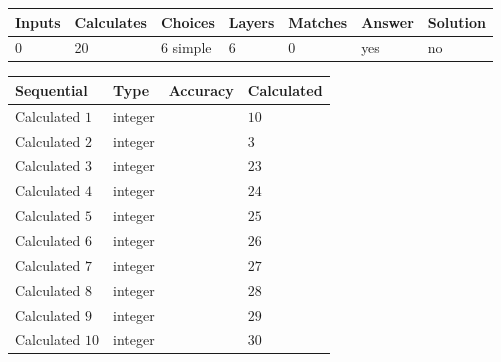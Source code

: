 \documentclass[12pt]{article}
\begin{document}
 
\noindent{}
 
 
   
   
   
   
\noindent\begin{tabular}{|l|l|l|l|l|l|l|}
 \hline
Inputs & Calculates & Choices & Layers & Matches & Answer & Solution \\ \hline
           0 & 
          20 & 
           6
  simple  
  & 
           6 & 
           0 & 
  yes & 
  no 
  \\ \hline
 \end{tabular}
   
   
   
   
\noindent{}
   
   
  
  
\noindent\begin{tabular}{|l|l|l|l|}
\hline
 Sequential & Type & Accuracy & Calculated \\ 
\hline
 
 
  Calculated $           1$ & integer &  & 
  $ 10 $ 
 \\  \hline  
 
 
  Calculated $           2$ & integer &  & 
  $ 3 $ 
 \\  \hline  
 
 
  Calculated $           3$ & integer &  & 
  $ 23 $ 
 \\  \hline  
 
 
  Calculated $           4$ & integer &  & 
  $ 24 $ 
 \\  \hline  
 
 
  Calculated $           5$ & integer &  & 
  $ 25 $ 
 \\  \hline  
 
 
  Calculated $           6$ & integer &  & 
  $ 26 $ 
 \\  \hline  
 
 
  Calculated $           7$ & integer &  & 
  $ 27 $ 
 \\  \hline  
 
 
  Calculated $           8$ & integer &  & 
  $ 28 $ 
 \\  \hline  
 
 
  Calculated $           9$ & integer &  & 
  $ 29 $ 
 \\  \hline  
 
 
  Calculated $          10$ & integer &  & 
  $ 30 $ 
 \\  \hline  
 \end{tabular}
   
\end{document}
